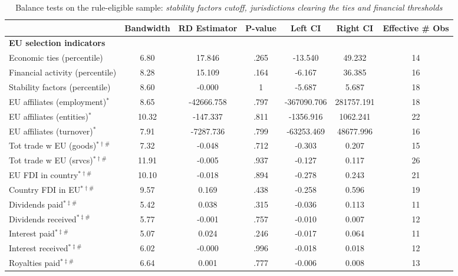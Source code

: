 \begin{table}[htbp]\centering \caption{Balance tests on the rule-eligible sample: \emph{stability factors cutoff, jurisdictions clearing the ties and financial thresholds}\label{t:balanceEligZfrontier}} \begin{adjustbox}{width=1\textwidth} \begin{tabular}{l*{6}{c}} \toprule 
          &Bandwidth&RD Estimator&  P-value&  Left CI& Right CI&Effective \# Obs\\
\midrule
{\bf EU selection indicators}&         &         &         &         &         &         \\
Economic ties (percentile)&     6.80&   17.846&     .265&  -13.540&   49.232&       14\\
Financial activity (percentile)&     8.28&   15.109&     .164&   -6.167&   36.385&       16\\
Stability factors (percentile)&     8.60&   -0.000&        1&   -5.687&    5.687&       18\\
EU affiliates (employment)\(^{*}\)&     8.65&-42666.758&     .797&-367090.706&281757.191&       18\\
EU affiliates (entities)\(^{*}\)&    10.32& -147.337&     .811&-1356.916& 1062.241&       22\\
EU affiliates (turnover)\(^{*}\)&     7.91&-7287.736&     .799&-63253.469&48677.996&       16\\
Tot trade w EU (goods)\(^{*\dag\#}\)&     7.32&   -0.048&     .712&   -0.303&    0.207&       15\\
Tot trade w EU (srvcs)\(^{*\dag\#}\)&    11.91&   -0.005&     .937&   -0.127&    0.117&       26\\
EU FDI in country\(^{*\dagger\#}\)&    10.10&   -0.018&     .894&   -0.278&    0.243&       21\\
Country FDI in EU\(^{*\dagger\#}\)&     9.57&    0.169&     .438&   -0.258&    0.596&       19\\
Dividends paid\(^{*\ddagger\#}\)&     5.42&    0.038&     .315&   -0.036&    0.113&       11\\
Dividends received\(^{*\ddagger\#}\)&     5.77&   -0.001&     .757&   -0.010&    0.007&       12\\
Interest paid\(^{*\ddagger\#}\)&     5.07&    0.024&     .246&   -0.017&    0.064&       11\\
Interest received\(^{*\ddagger\#}\)&     6.02&   -0.000&     .996&   -0.018&    0.018&       12\\
Royalties paid\(^{*\ddagger\#}\)&     6.64&    0.001&     .777&   -0.006&    0.008&       13\\

\end{tabular}
\end{adjustbox}
\end{table}
